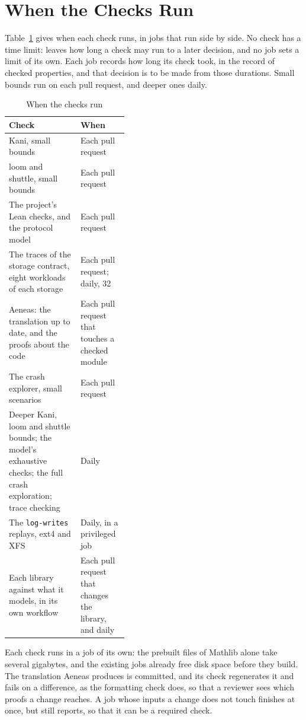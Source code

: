 \section{When the Checks Run}
\label{app:verification-schedule}

Table~\ref{tab:verification-schedule} gives when each check runs, in jobs
that run side by side. No check has a time limit:
 leaves how long a check may run to a
later decision, and no job sets a limit of its own. Each job records how
long its check took, in the record of checked properties, and that decision
is to be made from those durations. Small bounds run on each pull request,
and deeper ones daily.

\begin{table}[tb]
\centering\small\renewcommand{\arraystretch}{1.3}%
\caption{When the checks run}\label{tab:verification-schedule}
\begin{tabularx}{\linewidth}{|>{\raggedright\arraybackslash}X|>{\raggedright\arraybackslash}p{0.4\linewidth}|}
\hline
\textbf{Check} & \textbf{When} \\
\hline
Kani, small bounds & Each pull request \\
\hline
loom and shuttle, small bounds & Each pull request \\
\hline
The project's Lean checks, and the protocol model & Each pull request \\
\hline
The traces of the storage contract, eight workloads of each storage & Each pull request; daily, 32 \\
\hline
Aeneas: the translation up to date, and the proofs about the code & Each pull request that touches a checked module \\
\hline
The crash explorer, small scenarios & Each pull request \\
\hline
Deeper Kani, loom and shuttle bounds; the model's exhaustive checks; the full crash exploration; trace checking & Daily \\
\hline
The \texttt{log-writes} replays, ext4 and XFS & Daily, in a privileged job \\
\hline
Each library against what it models, in its own workflow & Each pull request that changes the library, and daily \\
\hline
\end{tabularx}
\end{table}

Each check runs in a job of its own: the prebuilt files of Mathlib alone
take several gigabytes, and the existing jobs already free disk space before
they build. The translation Aeneas produces is committed, and its check
regenerates it and fails on a difference, as the formatting check does, so
that a reviewer sees which proofs a change reaches. A job whose inputs a
change does not touch finishes at once, but still reports, so that it can be
a required check.

